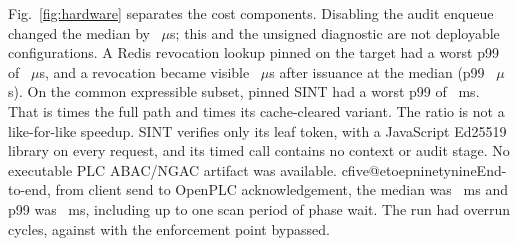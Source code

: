 Fig.~\ref{fig:hardware} separates the cost components. Disabling the audit enqueue changed the median by ~$\mu$s; this and the unsigned diagnostic are not deployable configurations. A Redis revocation lookup pinned on the target had a worst p99 of ~$\mu$s, and a revocation became visible ~$\mu$s after issuance at the median (p99 ~$\mu$s). On the common expressible subset, pinned SINT had a worst p99 of ~ms. That is  times the full \zonecap{} path and  times its cache-cleared variant. The ratio is not a like-for-like speedup. SINT verifies only its leaf token, with a JavaScript Ed25519 library on every request, and its timed call contains no context or audit stage. No executable PLC ABAC/NGAC artifact was available. \ifcsname cfive@etoepninetynine\endcsname End-to-end, from client send to OpenPLC acknowledgement, the median was ~ms and p99 was ~ms, including up to one scan period of phase wait. The run had  overrun cycles, against  with the enforcement point bypassed.\fi
